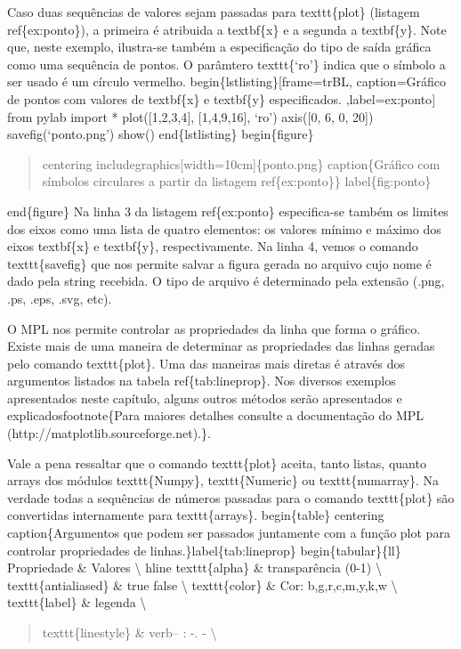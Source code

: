 \documentclass[a4paper,10pt,brazil]{sphinxmanual}
\begin{document}
Caso duas sequências de valores sejam passadas para texttt\{plot\} (listagem ref\{ex:ponto\}), a primeira é atribuida a textbf\{x\} e a segunda a textbf\{y\}. Note que, neste exemplo, ilustra-se também a especificação do tipo de saída gráfica como uma sequência de pontos. O parâmtero texttt\{`ro'\} indica que o símbolo a ser usado é um círculo vermelho.
begin\{lstlisting\}{[}frame=trBL, caption=Gráfico de pontos com valores de textbf\{x\} e textbf\{y\} especificados. ,label=ex:ponto{]}
from pylab import *
plot({[}1,2,3,4{]}, {[}1,4,9,16{]}, `ro')
axis({[}0, 6, 0, 20{]})
savefig(`ponto.png')
show()
end\{lstlisting\}
begin\{figure\}
\begin{quote}

centering
includegraphics{[}width=10cm{]}\{ponto.png\}
caption\{Gráfico com símbolos circulares a partir da listagem ref\{ex:ponto\}\}
label\{fig:ponto\}
\end{quote}

end\{figure\}
Na linha 3 da listagem ref\{ex:ponto\} especifica-se também os limites dos eixos como uma lista de quatro elementos: os valores mínimo e máximo dos eixos textbf\{x\} e textbf\{y\}, respectivamente. Na linha 4, vemos o comando texttt\{savefig\} que nos permite salvar a figura gerada no arquivo cujo nome é dado pela string recebida. O tipo de arquivo é determinado pela extensão (.png, .ps, .eps, .svg, etc).

O MPL nos permite controlar as propriedades da linha que forma o gráfico. Existe mais de uma maneira de determinar as propriedades das linhas geradas pelo comando texttt\{plot\}. Uma das maneiras mais diretas é através dos argumentos listados na tabela ref\{tab:lineprop\}. Nos diversos exemplos apresentados neste capítulo, alguns outros métodos serão apresentados e explicadosfootnote\{Para maiores detalhes consulte a documentação do MPL (http://matplotlib.sourceforge.net).\}.

Vale a pena ressaltar que o comando texttt\{plot\} aceita, tanto listas, quanto arrays dos módulos texttt\{Numpy\}, texttt\{Numeric\} ou texttt\{numarray\}. Na verdade todas a sequências de números passadas para o comando texttt\{plot\} são convertidas internamente para texttt\{arrays\}.
begin\{table\}
centering
caption\{Argumentos que podem ser passados juntamente com a função plot para controlar propriedades de linhas.\}label\{tab:lineprop\}
begin\{tabular\}\{l\textbar{}l\}
Propriedade \& Valores \textbackslash{}
hline
texttt\{alpha\} \& transparência (0-1) \textbackslash{}
texttt\{antialiased\} \& true \textbar{} false \textbackslash{}
texttt\{color\} \& Cor: b,g,r,c,m,y,k,w \textbackslash{}
texttt\{label\} \& legenda \textbackslash{}
\begin{quote}

texttt\{linestyle\} \& verb\textbar{}-- : -. -\textbar{} \textbackslash{}
\end{quote}
\end{document}
